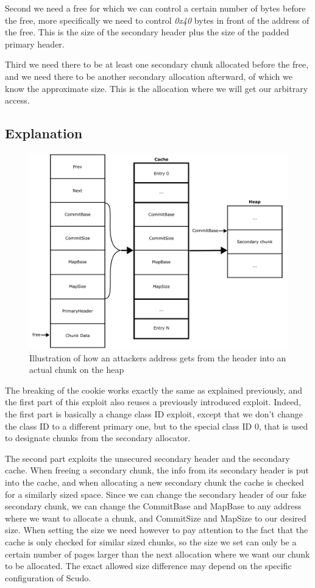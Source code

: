 \documentclass[a4paper,11pt,oneside]{report}
\begin{document}
Second we need a free for which we can control a certain number of bytes before the free,
more specifically we need to control \emph{0x40} bytes in front of the address of the
free. This is the size of the secondary header plus the size of the padded primary header.

Third we need there to be at least one secondary chunk allocated before the free, and we
need there to be another secondary allocation afterward, of which we know the approximate
size. This is the allocation where we will get our arbitrary access.

\subsection{Explanation}

\begin{figure}[h!]
  \centering
  \includegraphics[width=\linewidth]{figures/CommitBase.png}
  \caption{Illustration of how an attackers address gets from the header into an actual
    chunk on the heap}\label{fig:CommitBase}
\end{figure}

The breaking of the cookie works exactly the same as explained previously, and the first
part of this exploit also reuses a previously introduced exploit. Indeed, the first part is
basically a change class ID exploit, except that we don't change the class ID to a
different primary one, but to the special class ID 0, that is used to designate chunks
from the secondary allocator.

The second part exploits the unsecured secondary header and the secondary cache. When
freeing a secondary chunk, the info from its secondary header is put into the cache, and
when allocating a new secondary chunk the cache is checked for a similarly sized
space. Since we can change the secondary header of our fake secondary chunk, we can change
the CommitBase and MapBase to any address where we want to allocate a chunk, and
CommitSize and MapSize to our desired size. When setting the size we need however to pay
attention to the fact that the cache is only checked for similar sized chunks, so the size
we set can only be a certain number of pages larger than the next allocation where we want
our chunk to be allocated. The exact allowed size difference may depend on the specific
configuration of Scudo.
\end{document}
